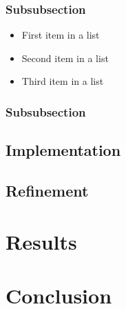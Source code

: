 \documentclass[fleqn,10pt]{SelfArx} %
\begin{document}
\subsubsection{Subsubsection}

\lipsum[13] %

\begin{itemize}[noitemsep] %
	\item First item in a list
	\item Second item in a list
	\item Third item in a list
\end{itemize}

\subsubsection{Subsubsection}

\lipsum[14] %

\subsection{Implementation}

\lipsum[15-23] %

\subsection{Refinement}

\lipsum[15-23] %

\section{Results}
\lipsum[15-23] %
\section{Conclusion}
\lipsum[15-23] %






{} %



\end{document}
